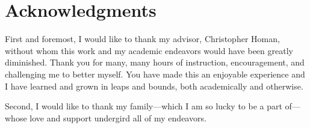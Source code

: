 
\chapter*{Acknowledgments}

First and foremost, I would like to thank my advisor, Christopher Homan, without whom this work and my academic endeavors would have been greatly diminished. Thank you for many, many hours of instruction, encouragement, and challenging me to better myself. You have made this an enjoyable experience and I have learned and grown in leaps and bounds, both academically and otherwise.

Second, I would like to thank my family---which I am so lucky to be a part of---whose love and support undergird all of my endeavors.
